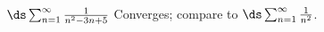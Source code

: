 {$\ds \sum_{n=1}^\infty \frac{1}{n^2 -3n+5}$
}
{Converges; compare to $\ds \sum_{n=1}^\infty \frac 1{n^2}$.
}